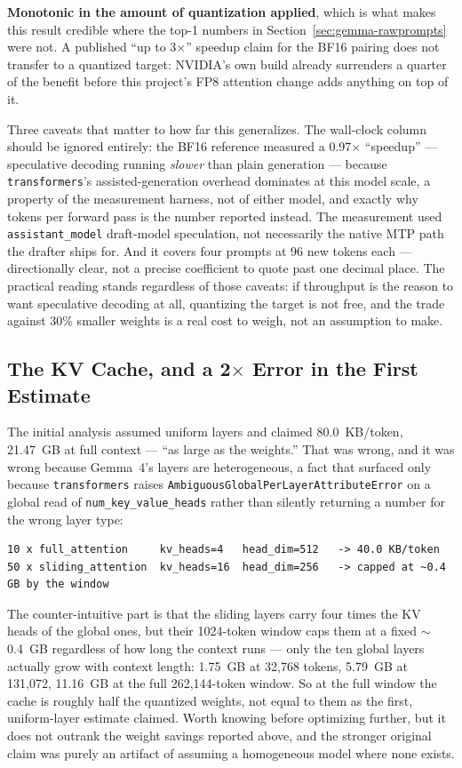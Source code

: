 \documentclass[11pt]{article}
\begin{document}
\textbf{Monotonic in the amount of quantization applied}, which is what makes this
result credible where the top-1 numbers in Section~\ref{sec:gemma-rawprompts} were not.
A published ``up to 3$\times$'' speedup claim for the BF16 pairing does not transfer to
a quantized target: NVIDIA's own build already surrenders a quarter of the benefit
before this project's FP8 attention change adds anything on top of it.

Three caveats that matter to how far this generalizes. The wall-clock column should be
ignored entirely: the BF16 reference measured a 0.97$\times$ ``speedup'' ---
speculative decoding running \emph{slower} than plain generation --- because
\texttt{transformers}'s assisted-generation overhead dominates at this model scale, a
property of the measurement harness, not of either model, and exactly why tokens per
forward pass is the number reported instead. The measurement used
\texttt{assistant\_model} draft-model speculation, not necessarily the native MTP path
the drafter ships for. And it covers four prompts at 96 new tokens each --- directionally
clear, not a precise coefficient to quote past one decimal place. The practical reading
stands regardless of those caveats: if throughput is the reason to want speculative
decoding at all, quantizing the target is not free, and the trade against 30\% smaller
weights is a real cost to weigh, not an assumption to make.

\subsection{The KV Cache, and a 2$\times$ Error in the First Estimate}

The initial analysis assumed uniform layers and claimed 80.0~KB/token, 21.47~GB at full
context --- ``as large as the weights.'' That was wrong, and it was wrong because
Gemma~4's layers are heterogeneous, a fact that surfaced only because
\texttt{transformers} raises \texttt{AmbiguousGlobalPerLayerAttributeError} on a global
read of \texttt{num\_key\_value\_heads} rather than silently returning a number for the
wrong layer type:

\begin{lstlisting}
10 x full_attention     kv_heads=4   head_dim=512   -> 40.0 KB/token
50 x sliding_attention  kv_heads=16  head_dim=256   -> capped at ~0.4 GB by the window
\end{lstlisting}

The counter-intuitive part is that the sliding layers carry four times the KV heads of
the global ones, but their 1024-token window caps them at a fixed $\sim$0.4~GB
regardless of how long the context runs --- only the ten global layers actually grow with
context length: 1.75~GB at 32,768 tokens, 5.79~GB at 131,072, 11.16~GB at the full
262,144-token window. So at the full window the cache is roughly half the quantized
weights, not equal to them as the first, uniform-layer estimate claimed. Worth knowing
before optimizing further, but it does not outrank the weight savings reported above,
and the stronger original claim was purely an artifact of assuming a homogeneous model
where none exists.
\end{document}
